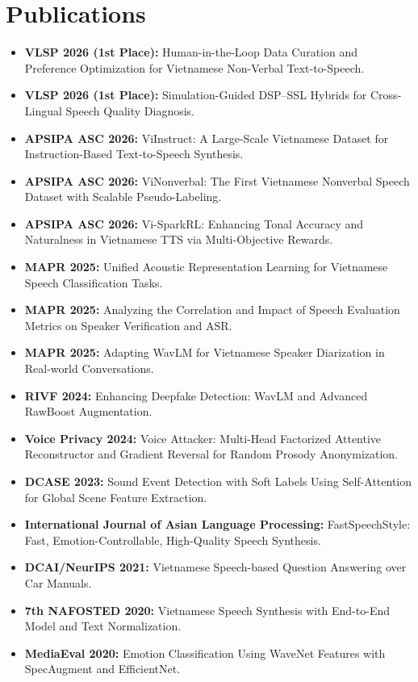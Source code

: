\documentclass[10pt,a4paper]{article}
\begin{document}
\section{Publications}

\begin{itemize}
  \item \textbf{VLSP 2026 (1st Place):} Human-in-the-Loop Data Curation and Preference Optimization for Vietnamese Non-Verbal Text-to-Speech.
  \item \textbf{VLSP 2026 (1st Place):} Simulation-Guided DSP--SSL Hybrids for Cross-Lingual Speech Quality Diagnosis.
  \item \textbf{APSIPA ASC 2026:} ViInstruct: A Large-Scale Vietnamese Dataset for Instruction-Based Text-to-Speech Synthesis.
  \item \textbf{APSIPA ASC 2026:} ViNonverbal: The First Vietnamese Nonverbal Speech Dataset with Scalable Pseudo-Labeling.
  \item \textbf{APSIPA ASC 2026:} Vi-SparkRL: Enhancing Tonal Accuracy and Naturalness in Vietnamese TTS via Multi-Objective Rewards.

  \item \textbf{MAPR 2025:} Unified Acoustic Representation Learning for Vietnamese Speech Classification Tasks.
  \item \textbf{MAPR 2025:} Analyzing the Correlation and Impact of Speech Evaluation Metrics on Speaker Verification and ASR.
  \item \textbf{MAPR 2025:} Adapting WavLM for Vietnamese Speaker Diarization in Real-world Conversations.

  \item \textbf{RIVF 2024:} Enhancing Deepfake Detection: WavLM and Advanced RawBoost Augmentation.
  \item \textbf{Voice Privacy 2024:} Voice Attacker: Multi-Head Factorized Attentive Reconstructor and Gradient Reversal for Random Prosody Anonymization.
  \item \textbf{DCASE 2023:} Sound Event Detection with Soft Labels Using Self-Attention for Global Scene Feature Extraction.
  \item \textbf{International Journal of Asian Language Processing:} FastSpeechStyle: Fast, Emotion-Controllable, High-Quality Speech Synthesis.
  \item \textbf{DCAI/NeurIPS 2021:} Vietnamese Speech-based Question Answering over Car Manuals.
  \item \textbf{7th NAFOSTED 2020:} Vietnamese Speech Synthesis with End-to-End Model and Text Normalization.
  \item \textbf{MediaEval 2020:} Emotion Classification Using WaveNet Features with SpecAugment and EfficientNet.
\end{itemize}
\end{document}
